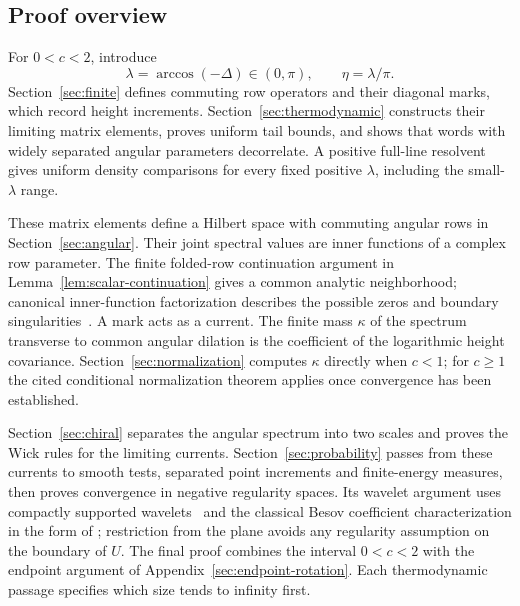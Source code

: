 \subsection{Proof overview}\label{sec:overview}

For \(0<c<2\), introduce
\[
 \lambda=\arccos(-\Delta)\in(0,\pi),
 \qquad \eta=\lambda/\pi.
\]
Section~\ref{sec:finite} defines commuting row operators and their diagonal
marks, which record height increments. Section~\ref{sec:thermodynamic}
constructs their limiting matrix elements, proves uniform tail bounds,
and shows that words with widely separated angular parameters decorrelate.
A positive full-line resolvent gives uniform density comparisons for
every fixed positive \(\lambda\), including the small-\(\lambda\) range.

These matrix elements define a Hilbert space with commuting angular rows
in Section~\ref{sec:angular}. Their joint spectral values are inner functions
of a complex row parameter. The finite folded-row continuation argument
in Lemma~\ref{lem:scalar-continuation} gives a common analytic neighborhood;
canonical inner-function factorization describes the possible zeros and
boundary singularities~\cite{AiDongJiang2019}. A mark acts as a current.
The finite mass
\(\kappa\) of the spectrum transverse to common angular dilation is the
coefficient of the logarithmic height covariance. Section~\ref{sec:normalization}
computes \(\kappa\) directly when \(c<1\); for \(c\ge1\) the cited conditional
normalization theorem applies once convergence has been established.

Section~\ref{sec:chiral} separates the angular spectrum into two scales and
proves the Wick rules for the limiting currents. Section~\ref{sec:probability}
passes from these currents to smooth tests, separated point increments
and finite-energy measures, then proves convergence in negative
regularity spaces. Its wavelet
argument uses compactly supported wavelets~\cite{Daubechies1988} and
the classical Besov coefficient characterization in the form of
\cite[Proposition~2.3]{HairerLabbe2017}; restriction from the plane avoids
any regularity assumption on the boundary of \(U\).
The final proof combines the interval \(0<c<2\) with the endpoint
argument of Appendix~\ref{sec:endpoint-rotation}. Each thermodynamic
passage specifies which size tends to infinity first.
